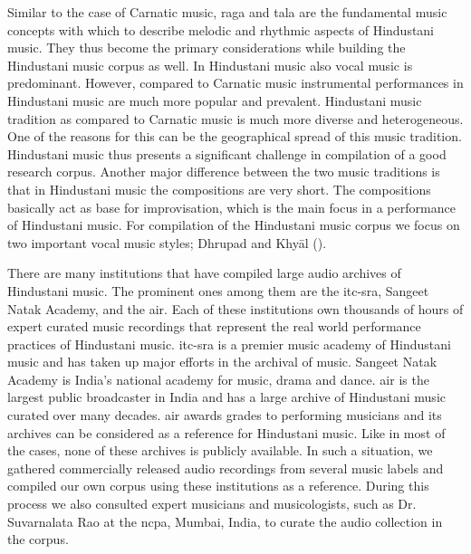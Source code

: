 Similar to the case of Carnatic music, \gls{raga} and \gls{tala} are the fundamental music concepts with which to describe melodic and rhythmic aspects of Hindustani music. They thus become the primary considerations while building the Hindustani music corpus as well. In Hindustani music also vocal music is predominant. However, compared to Carnatic music instrumental performances in Hindustani music are much more popular and prevalent. Hindustani music tradition as compared to Carnatic music is much more diverse and heterogeneous. One of the reasons for this can be the geographical spread of this music tradition. Hindustani music thus presents a significant challenge in compilation of a good research corpus. Another major difference between the two music traditions is that in Hindustani music the compositions are very short. The compositions basically act as base for improvisation, which is the main focus in a performance of Hindustani music. For compilation of the Hindustani music corpus we focus on two important vocal music styles; Dhrupad and Khy\={a}l (). %

There are many institutions that have compiled large audio archives of Hindustani music. The prominent ones among them are the \gls{itc-sra}, Sangeet Natak Academy, and the \gls{air}. Each of these institutions own thousands of hours of expert curated music recordings that represent the real world performance practices of Hindustani music. \gls{itc-sra} is a premier music academy of Hindustani music and has taken up major efforts in the archival of music. Sangeet Natak Academy is India’s national academy for music, drama and dance. \gls{air} is the largest public broadcaster in India and has a large archive of Hindustani music curated over many decades. \gls{air} awards grades to performing musicians and its archives can be considered as a reference for Hindustani music. Like in most of the cases, none of these archives is publicly available. In such a situation, we gathered commercially released audio recordings from several music labels and compiled our own corpus using these institutions as a reference. During this process we also consulted expert musicians and musicologists, such as Dr. Suvarnalata Rao at the \gls{ncpa}, Mumbai, India, to curate the audio collection in the corpus. 

